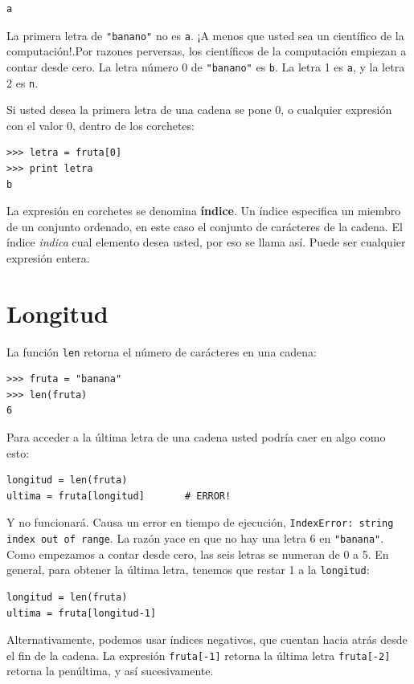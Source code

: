 \beforeverb
\begin{verbatim}
a
\end{verbatim}
\afterverb
%
La primera letra de \texttt{"banano"} no es \texttt{a}.  ¡A menos que usted
sea un científico de la computación!.Por  razones perversas, los 
científicos de la computación empiezan a contar desde cero. La letra número 
0 de \texttt{"banano"} es \texttt{b}.  La letra 1 es \texttt{a}, y la letra
 2 es \texttt{n}.

Si usted desea la primera letra de una cadena se pone 0, o cualquier
expresión con el valor 0, dentro de los corchetes:


\beforeverb
\begin{verbatim}
>>> letra = fruta[0]
>>> print letra
b
\end{verbatim}
\afterverb
%
La expresión en corchetes se denomina {\bf índice}.  Un índice
especifica un miembro de un conjunto ordenado, en este caso el 
conjunto de carácteres de la cadena. El índice  {\em indica} cual
elemento desea usted, por eso se llama así. Puede ser cualquier expresión
entera.



\section{Longitud}

La función  \texttt{len} retorna el número de carácteres en una cadena:

\beforeverb
\begin{verbatim}
>>> fruta = "banana"
>>> len(fruta)
6
\end{verbatim}
\afterverb
%
Para acceder a la última letra de una cadena usted podría caer en algo
como esto:

\beforeverb
\begin{verbatim}
longitud = len(fruta)
ultima = fruta[longitud]       # ERROR!
\end{verbatim}
\afterverb
%
Y no funcionará. Causa un error en tiempo de ejecución, \texttt{IndexError: string
index out of range}.  La razón yace en que no hay una letra 6 en 
\texttt{"banana"}.  Como empezamos a contar desde cero, las seis letras
se numeran de 0 a 5. En general, para obtener la última letra, tenemos que restar 1 a  la \texttt{longitud}:


\beforeverb
\begin{verbatim}
longitud = len(fruta)
ultima = fruta[longitud-1]
\end{verbatim}
\afterverb
%
Alternativamente, podemos usar índices negativos, que cuentan hacia atrás 
desde el fin de la cadena. La expresión \texttt{fruta[-1]} retorna la última letra
\texttt{fruta[-2]} retorna la penúltima, y así sucesivamente.

